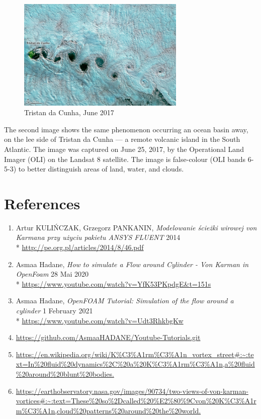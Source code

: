 \documentclass[a4paper,11pt]{article}
\begin{document}
\begin{figure}[h]
\centering
\includegraphics[width=8cm]{tristan.JPG}
\caption{Tristan da Cunha, June 2017}
\end{figure}

The second image shows the same phenomenon occurring an ocean basin away, on the lee side of Tristan da Cunha — a remote volcanic island in the South Atlantic. The image was captured on June 25, 2017, by the Operational Land Imager (OLI) on the Landsat 8 satellite. The image is false-colour (OLI bands 6-5-3) to better distinguish areas of land, water, and clouds.


\section{References}
 
\begin{enumerate}

\item  Artur KULIŃCZAK, Grzegorz PANKANIN, \textit{Modelowanie ścieżki wirowej von Karmana przy użyciu pakietu
ANSYS FLUENT} 2014
\\*
\url{http://pe.org.pl/articles/2014/8/46.pdf}

\item  Asmaa Hadane, \textit{How to simulate a Flow around Cylinder - Von Karman in OpenFoam} 28 Mai 2020\\*
\url{https://www.youtube.com/watch?v=YfK53PKpdgE&t=151s}

\item  Asmaa Hadane, \textit{OpenFOAM Tutorial: Simulation of the flow around a cylinder} 1 February 2021\\*
\url{https://www.youtube.com/watch?v=Udt3RhkbgKw}

\item \url{https://github.com/AsmaaHADANE/Youtube-Tutorials.git}

\item \url{https://en.wikipedia.org/wiki/K%C3%A1rm%C3%A1n_vortex_street#:~:text=In%20fluid%20dynamics%2C%20a%20K%C3%A1rm%C3%A1n,a%20fluid%20around%20blunt%20bodies.}

\item \url{https://earthobservatory.nasa.gov/images/90734/two-views-of-von-karman-vortices#:~:text=These%20so%2Dcalled%20%E2%80%9Cvon%20K%C3%A1rm%C3%A1n,cloud%20patterns%20around%20the%20world.}

\end{enumerate}
\end{document}

